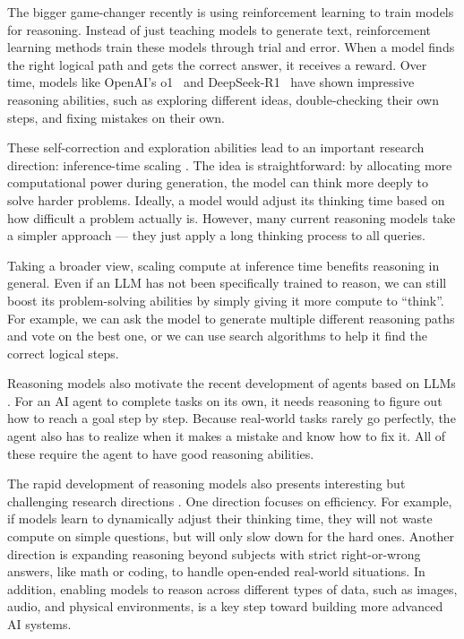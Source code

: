 The bigger game-changer recently is using reinforcement learning to train models for reasoning. Instead of just teaching models to generate text, reinforcement learning methods train these models through trial and error. When a model finds the right logical path and gets the correct answer, it receives a reward. Over time, models like OpenAI's o1~\cite{openai:2024learning} and DeepSeek-R1~\cite{deepseek:2025r1} have shown impressive reasoning abilities, such as exploring different ideas, double-checking their own steps, and fixing mistakes on their own.

These self-correction and exploration abilities lead to an important research direction: inference-time scaling \cite{snell-etal:2024scaling}. The idea is straightforward: by allocating more computational power during generation, the model can think more deeply to solve harder problems. Ideally, a model would adjust its thinking time based on how difficult a problem actually is. However, many current reasoning models take a simpler approach --- they just apply a long thinking process to all queries.

Taking a broader view, scaling compute at inference time benefits reasoning in general. Even if an LLM has not been specifically trained to reason, we can still boost its problem-solving abilities by simply giving it more compute to ``think''. For example, we can ask the model to generate multiple different reasoning paths and vote on the best one, or we can use search algorithms to help it find the correct logical steps.

Reasoning models also motivate the recent development of agents based on LLMs \cite{yao-etal:2023react,wang-etal:2024survey}. For an AI agent to complete tasks on its own, it needs reasoning to figure out how to reach a goal step by step. Because real-world tasks rarely go perfectly, the agent also has to realize when it makes a mistake and know how to fix it. All of these require the agent to have good reasoning abilities.

The rapid development of reasoning models also presents interesting but challenging research directions \cite{li-etal:2025system,chen-etal:2026towards}. One direction focuses on efficiency. For example, if models learn to dynamically adjust their thinking time, they will not waste compute on simple questions, but will only slow down for the hard ones. Another direction is expanding reasoning beyond subjects with strict right-or-wrong answers, like math or coding, to handle open-ended real-world situations. In addition, enabling models to reason across different types of data, such as images, audio, and physical environments, is a key step toward building more advanced AI systems.

